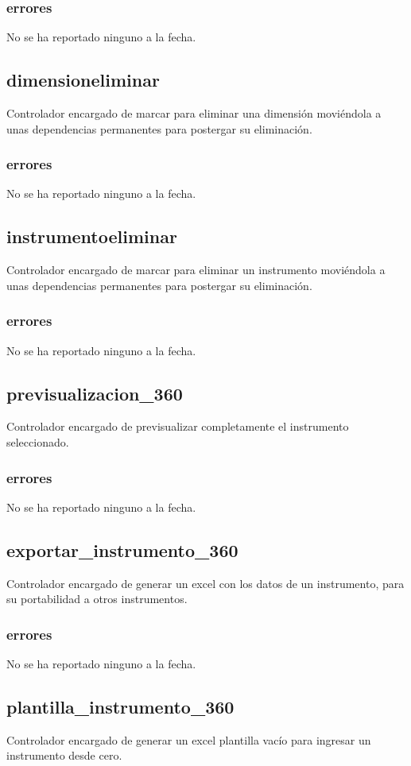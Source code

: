 \documentclass[10pt,a4paper]{book}
\begin{document}
	\subsubsection{errores}
	No se ha reportado ninguno a la fecha.
	
	\subsection{dimensioneliminar}
	Controlador encargado de marcar para eliminar una dimensión moviéndola a unas dependencias permanentes para postergar su eliminación.
	\subsubsection{errores}
	No se ha reportado ninguno a la fecha.
	
	\subsection{instrumentoeliminar}
	Controlador encargado de marcar para eliminar un instrumento moviéndola a unas dependencias permanentes para postergar su eliminación.
	\subsubsection{errores}
	No se ha reportado ninguno a la fecha.
	
	\subsection{previsualizacion\_360}
	Controlador encargado de previsualizar completamente el instrumento seleccionado.
	\subsubsection{errores}
	No se ha reportado ninguno a la fecha.
	
	\subsection{exportar\_instrumento\_360}
	Controlador encargado de generar un excel con los datos de un instrumento, para su portabilidad a otros instrumentos.
	\subsubsection{errores}
	No se ha reportado ninguno a la fecha.
	
	\subsection{plantilla\_instrumento\_360}
	Controlador encargado de generar un excel plantilla vacío para ingresar un instrumento desde cero.
\end{document}
